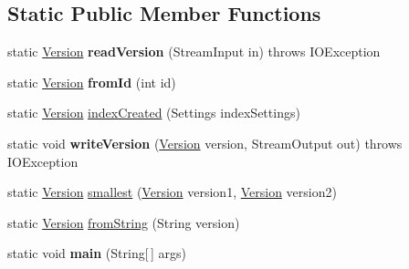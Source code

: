 \subsection*{Static Public Member Functions}
\begin{DoxyCompactItemize}
\item 
\hypertarget{classorg_1_1elasticsearch_1_1_version_a5727ea8291db517bb5f34a1d260ae52b}{}\label{classorg_1_1elasticsearch_1_1_version_a5727ea8291db517bb5f34a1d260ae52b} 
static \hyperlink{classorg_1_1elasticsearch_1_1_version}{Version} {\bfseries read\+Version} (Stream\+Input in)  throws I\+O\+Exception 
\item 
\hypertarget{classorg_1_1elasticsearch_1_1_version_a50d41630cc6151425839dc725ff218e9}{}\label{classorg_1_1elasticsearch_1_1_version_a50d41630cc6151425839dc725ff218e9} 
static \hyperlink{classorg_1_1elasticsearch_1_1_version}{Version} {\bfseries from\+Id} (int id)
\item 
static \hyperlink{classorg_1_1elasticsearch_1_1_version}{Version} \hyperlink{classorg_1_1elasticsearch_1_1_version_a6c61e82b33e6a02aeea43e0d5db810df}{index\+Created} (Settings index\+Settings)
\item 
\hypertarget{classorg_1_1elasticsearch_1_1_version_aa3c90bc0dea3484e4b887ab6dc030972}{}\label{classorg_1_1elasticsearch_1_1_version_aa3c90bc0dea3484e4b887ab6dc030972} 
static void {\bfseries write\+Version} (\hyperlink{classorg_1_1elasticsearch_1_1_version}{Version} version, Stream\+Output out)  throws I\+O\+Exception 
\item 
static \hyperlink{classorg_1_1elasticsearch_1_1_version}{Version} \hyperlink{classorg_1_1elasticsearch_1_1_version_ab8ee3b9ccaaccbf4980b74541a5f7681}{smallest} (\hyperlink{classorg_1_1elasticsearch_1_1_version}{Version} version1, \hyperlink{classorg_1_1elasticsearch_1_1_version}{Version} version2)
\item 
static \hyperlink{classorg_1_1elasticsearch_1_1_version}{Version} \hyperlink{classorg_1_1elasticsearch_1_1_version_a86635d26e4db619bfa9f33cee16be1e5}{from\+String} (String version)
\item 
\hypertarget{classorg_1_1elasticsearch_1_1_version_a0e8c9543e498ded25a46579eef920a3d}{}\label{classorg_1_1elasticsearch_1_1_version_a0e8c9543e498ded25a46579eef920a3d} 
static void {\bfseries main} (String\mbox{[}$\,$\mbox{]} args)
\end{DoxyCompactItemize}

